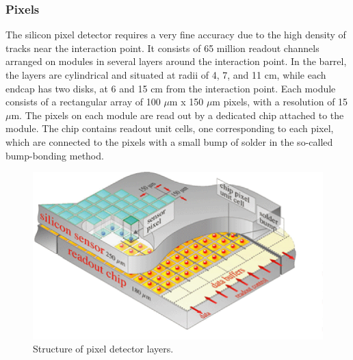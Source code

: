 \subsubsection{Pixels}
\label{exp:pixels}
The silicon pixel detector 
requires %
a very fine accuracy
due to the high density of tracks near the interaction point.  
It consists of 65 million readout channels 
arranged on modules in several layers around the interaction point.
In the barrel, the layers are cylindrical and situated at
radii of 4, 7, and 11 cm, 
while each endcap has two disks, at 6 and 15 cm from the
interaction point. 
Each module consists of a rectangular array of 100 $\mu$m x 150 $\mu$m pixels, 
with a resolution of 
15 $\mu$m.  
The pixels on each module are read out by a dedicated chip attached 
to the module. 
The chip contains readout unit cells, one corresponding to each pixel,
which are connected to the pixels with a small bump of solder 
in the so-called bump-bonding method.  

 \begin{figure}[htb]
  \begin{center}
    \includegraphics[width=360pt]{Figures/tracker-Pixelement.png}
  \end{center}
  \caption[\fixspacing Structure of pixel detector layers]
	  {\fixspacing Structure of pixel detector layers.}
  \label{fig:PixelLayers}
 \end{figure}

